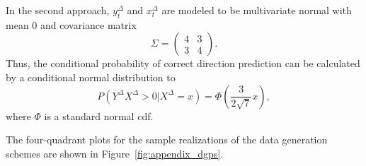 \documentclass[pdflatex]{sn-jnl}
\theoremstyle{plain}%
\theoremstyle{definition}
\newcommand{\diffxrv}{X^{\Delta}}
\newcommand{\diffyrv}{Y^{\Delta}}
\newcommand{\diffxt}[1][t]{x^{\Delta}_{#1}}
\newcommand{\diffyt}[1][t]{y^{\Delta}_{#1}}
\begin{document}
In the second approach, $\diffyt$ and $\diffxt$ are modeled to be multivariate normal with mean 0 and covariance matrix
\begin{equation*}
    \Sigma = \begin{pmatrix} 4 & 3 \\ 3 & 4 \end{pmatrix}.
\end{equation*}
Thus, the conditional probability of correct direction prediction can be calculated by a conditional normal distribution to
\begin{equation*}
    P(\diffyrv \diffxrv > 0 | \diffxrv = x) = \Phi \left( \frac{3}{2 \sqrt{7}} x \right),
\end{equation*}
where $\Phi$ is a standard normal \ac{cdf}.

The four-quadrant plots for the sample realizations of the data generation schemes are shown in Figure~\ref{fig:appendix_dgps}.
\end{document}
